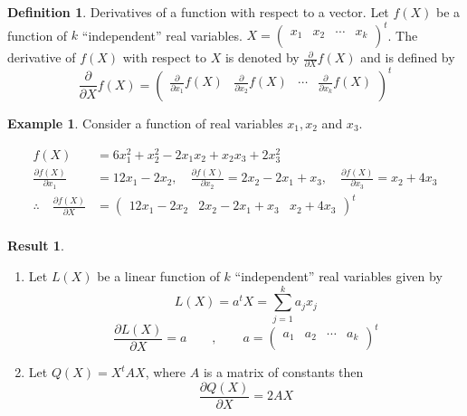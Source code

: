 \documentclass[11pt,a4paper]{article}
\theoremstyle{definition}
\newtheorem{defn}[thm]{Definition}
\newtheorem{exa}[thm]{Example}
\newtheorem{result}[thm]{Result}
\begin{document}
\begin{defn}\label{res:defn:1.3.1}
Derivatives of a function with respect to a vector. Let $f(X)$ be a function of $k$ ``independent'' real variables. $X=
\begin{pmatrix}
x_1 & x_2 & \cdots & x_k\\
\end{pmatrix}^t
$. The derivative of $f(X)$ with respect to $X$ is denoted by $\frac{\partial}{\partial X}f(X)$ and is defined by $$\frac{\partial}{\partial X}f(X)=
\begin{pmatrix}
\frac{\partial}{\partial x_1}f(X) & \frac{\partial}{\partial x_2}f(X) &\cdots & \frac{\partial}{\partial x_k}f(X)\\
\end{pmatrix}^t
$$
\end{defn}


\begin{exa}
Consider a function of real variables $x_1,x_2$ and $x_3$.

\begin{align*}
f(X) & = 6x_1^2+x_2^2-2x_1x_2+x_2x_3+2x_3^2\\
\frac{\partial f(X)}{\partial x_1} & = 12x_1-2x_2,\quad  \frac{\partial f(X)}{\partial x_2}=2x_2-2x_1+x_3,\quad  \frac{\partial f(X)}{\partial x_3}=x_2+4x_3\\
\therefore\quad  \frac{\partial f(X)}{\partial X} & =
\begin{pmatrix}
12x_1-2x_2 & 2x_2-2x_1+x_3 & x_2+4x_3
\end{pmatrix}^t\\
\end{align*}
\end{exa}


\begin{result}\label{res:result:1.3.2}
\begin{enumerate}
\item[i).] Let $L(X)$ be a linear function of $k$ ``independent'' real variables given by $$L(X)=a^tX=\sum^k_{j=1}a_jx_j$$
$$\frac{\partial L(X)}{\partial X}=a\qquad ,\qquad  a=
\begin{pmatrix}
a_1 & a_2 & \cdots & a_k\\
\end{pmatrix}^t
$$
\item[ii).] Let $Q(X)=X^tAX$, where $A$ is a matrix of constants then $$\frac{\partial Q(X)}{\partial X}=2AX$$\\
\end{enumerate}
\end{result}
\end{document}
